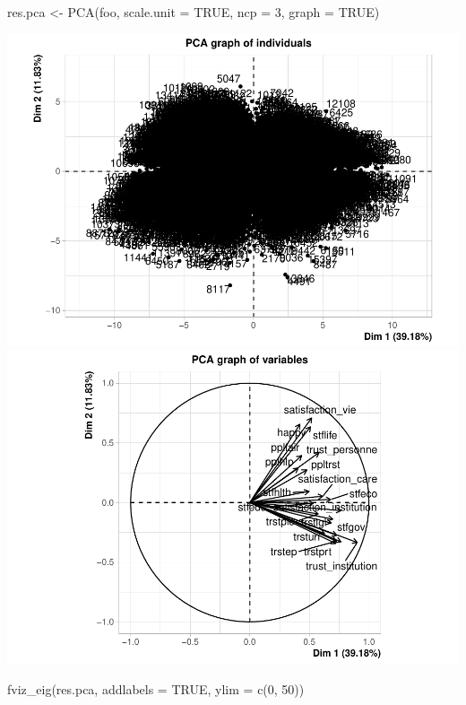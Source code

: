 \documentclass[
]{book}
\newenvironment{Shaded}{\begin{snugshade}}{\end{snugshade}}
\newcommand{\AttributeTok}[1]{\textcolor[rgb]{0.77,0.63,0.00}{#1}}
\newcommand{\ConstantTok}[1]{\textcolor[rgb]{0.00,0.00,0.00}{#1}}
\newcommand{\DecValTok}[1]{\textcolor[rgb]{0.00,0.00,0.81}{#1}}
\newcommand{\FunctionTok}[1]{\textcolor[rgb]{0.00,0.00,0.00}{#1}}
\newcommand{\NormalTok}[1]{#1}
\newcommand{\OtherTok}[1]{\textcolor[rgb]{0.56,0.35,0.01}{#1}}
\begin{document}
\begin{Shaded}
\begin{Highlighting}[]
\NormalTok{res.pca }\OtherTok{\textless{}{-}} \FunctionTok{PCA}\NormalTok{(foo, }\AttributeTok{scale.unit =} \ConstantTok{TRUE}\NormalTok{, }\AttributeTok{ncp =} \DecValTok{3}\NormalTok{, }\AttributeTok{graph =} \ConstantTok{TRUE}\NormalTok{)}
\end{Highlighting}
\end{Shaded}

\includegraphics{bookdown-demo_files/figure-latex/1103-2.pdf} \includegraphics{bookdown-demo_files/figure-latex/1103-3.pdf}

\begin{Shaded}
\begin{Highlighting}[]
\FunctionTok{fviz\_eig}\NormalTok{(res.pca, }\AttributeTok{addlabels =} \ConstantTok{TRUE}\NormalTok{, }\AttributeTok{ylim =} \FunctionTok{c}\NormalTok{(}\DecValTok{0}\NormalTok{, }\DecValTok{50}\NormalTok{))}
\end{Highlighting}
\end{Shaded}
\end{document}
